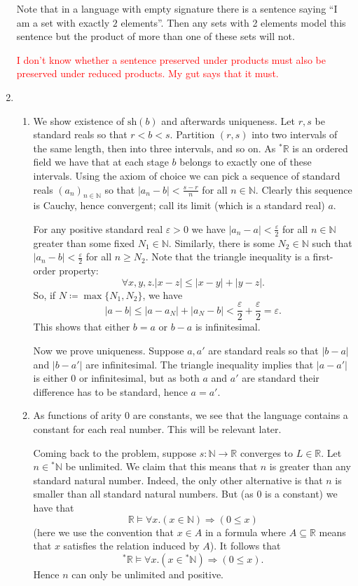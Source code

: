 \documentclass{article}
\theoremstyle{theorem}
\begin{document}
\begin{enumerate}[leftmargin=*]
			Note that in a language with empty signature there is a sentence saying ``I am a set with exactly $2$ elements''. Then any sets with 2 elements model this sentence but the product of more than one of these sets will not.
			
			\textcolor{red}{I don't know whether a sentence preserved under products must also be preserved under reduced products. My gut says that it must.}
			\item 
			\begin{enumerate}
				\item We show existence of $\text{sh}(b)$ and afterwards uniqueness. Let $r,s$ be standard reals so that $r < b <s$. Partition $(r,s)$ into two intervals of the same length, then into three intervals, and so on. As ${}^*\mathbb{R}$ is an ordered field we have that at each stage $b$ belongs to exactly one of these intervals. Using the axiom of choice we can pick a sequence of standard reals $(a_n)_{n\in \mathbb{N}}$ so that $|a_n - b| < \frac{s-r}{n}$ for all $n\in\mathbb{N}$. Clearly this sequence is Cauchy, hence convergent; call its limit (which is a standard real) $a$.
				
				For any positive standard real $\varepsilon > 0$ we have $|a_n - a|< \frac{\varepsilon}{2}$ for all $n\in\mathbb{N}$ greater than some fixed $N_1\in\mathbb{N}$.  Similarly, there is some $N_2\in\mathbb{N}$ such that $|a_{n} - b| < \frac{\varepsilon}{2}$ for all $n\geq N_2$. Note that the triangle inequality is a first-order property:
				\[
					\forall x,y,z. |x - z| \leq |x - y| + |y - z| .
				\]
				So, if $N\coloneqq \max\{N_1,N_2\}$, we have
				\[
					|a - b| \leq |a - a_N| + |a_N - b| < \frac{\varepsilon}{2} + \frac{\varepsilon}{2} = \varepsilon.
				\]
				This shows that either $b =a$ or $b-a$ is infinitesimal.
				
				Now we prove uniqueness. Suppose $a,a'$ are standard reals so that $|b-a|$ and $|b-a'|$ are infinitesimal. The triangle inequality implies that $|a - a'|$ is either 0 or infinitesimal, but as both $a$ and $a'$ are standard their difference has to be standard, hence $a = a'$.
				
				\item As functions of arity 0 are constants, we see that the language contains a constant for each real number. This will be relevant later.
							
				Coming back to the problem, suppose $s\colon \mathbb{N}\to \mathbb{R}$ converges to $L\in\mathbb{R}$. Let $n\in{}^*\mathbb{N}$ be unlimited. We claim that this means that $n$ is greater than any standard  natural number. Indeed, the only other alternative is that $n$ is smaller than all standard natural numbers. But (as 0 is a constant) we have that
				\[
					\mathbb{R}\models \forall x. (x\in \mathbb{N}) \Rightarrow (0 \leq x)
				\] 
				(here we use the convention that $x\in A$ in a formula where $A\subseteq \mathbb{R}$ means that $x$ satisfies the relation induced by $A$). It follows that 
				\[
					{}^*\mathbb{R}\models \forall x. (x\in {}^*\mathbb{N}) \Rightarrow (0 \leq x).
				\]
				Hence $n$ can only be unlimited and positive.
				

\end{enumerate}
\end{enumerate}
\end{document}
